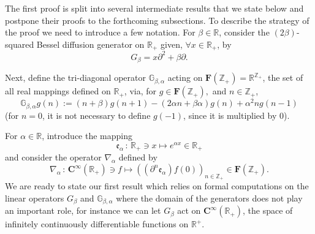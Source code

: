 \documentclass[10pt]{amsart}
\theoremstyle{definition}\newtheorem{defi}[theo]{Definition}\newtheorem{rema}[theo]{Remark}\newtheorem{exam}[theo]{Example}\newtheorem{exem}[theo]{Example}\newtheorem{nota}[theo]{Notation}
\newcommand{\df}{\mathrel{:=}}
\newcommand{\cC}{{\mathbf C}}
\newcommand{\RR}{\mathbb{R}}
\newcommand{\ZZ}{\mathbb{Z}}
\newcommand{\fe}{\mathfrak{e}}
\newcommand{\iy}{\infty}
\newcommand{\lt}{\left}
\newcommand{\na}{\nabla}
\newcommand{\pa}{\partial}
\newcommand{\rt}{\right}
\newcommand{\st}{\,:\,}
\newcommand{\dBg}{{\discret{G}}}
\newcommand{\Bg}{G}
\newcommand{\esF}{\mathbf{F}}
\newcommand*\R{{\mathbb R}}
\newcommand{\discret}[1]{\mathds{#1}}
\let\oldforall\forall
\renewcommand*{\forall}{\mathrel{\oldforall}}
\begin{document}
The first proof is split into several intermediate results that we state below and postpone their proofs to the forthcoming subsections. To describe the strategy of the proof we need to introduce a few notation. For $\beta\in\RR$, consider the $(2\beta)$-squared Bessel diffusion generator on $\RR_+$ given, $\forall x\in\RR_+$, by
\[
\Bg_{\beta}=x\pa^2+\beta\pa.
\]


Next, define the tri-diagonal operator $\dBg_{\beta,\alpha}$ acting on $\esF(\ZZ_+)=\RR^{\ZZ_+}$, the set of all real mappings defined on $\RR_+$, via, for $ g\in\esF(\ZZ_+),$ and $n\in \ZZ_+$,
\[
\dBg_{\beta,\alpha} g(n)\df (n+\beta)g(n+1)-(2\alpha n+\beta\alpha)g(n)+\alpha^2n g(n-1)
\]
(for $n=0$, it is not necessary to define $g(-1)$, since it is multiplied by 0).

For $\alpha\in\RR$, introduce the mapping
\[
\fe_{\alpha}\st \RR_+\ni x\mapsto e^{\alpha x}\in\RR_+
\]
and consider the operator $\na_{\alpha}$ defined by
\begin{equation}\label{nalph}
\na_{\alpha}\st \cC^\iy(\RR_+)\ni f\mapsto \lt((\pa^n\fe_{\alpha})f(0)\rt)_{n\in\ZZ_+}\in \esF(\ZZ_+).
\end{equation}
We are ready to state our first result which relies on formal computations on the linear operators $\Bg_{\beta}$ and $\dBg_{\beta,\alpha}$ where the domain of the generators does not play an important role, for instance we can let $\Bg_{\beta}$ act on $\cC^\iy(\RR_+)$, the space of infinitely continuously differentiable functions on $\R^+$.
\end{document}
